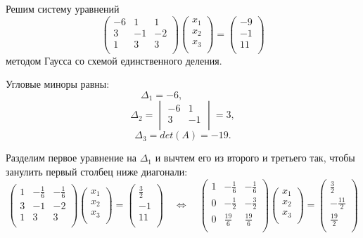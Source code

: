 \documentclass{article}
\begin{document}
\begin{example}\label{eq:gauss_elimination_example}
	Решим систему уравнений
	\[
		\begin{pmatrix}
			-6	& 1	& 1	\\
			3	& -1	& -2	\\
			1	& 3	& 3	\\
		\end{pmatrix}
		\begin{pmatrix}
			x_1 \\
			x_2 \\
			x_3 \\
		\end{pmatrix}
		=
		\begin{pmatrix}
			-9 \\
			-1 \\
			11 \\
		\end{pmatrix}
	\]
	методом Гаусса со схемой единственного деления.

	Угловые миноры равны:
	\[\Delta_1=-6,\qquad\qquad\;\]
	\[\Delta_2=
		\begin{vmatrix}
			-6	& 1	\\
			3	& -1	\\
		\end{vmatrix}
		=3,
	\]
	\[\Delta_3=det(A)=-19.\]

	Разделим первое уравнение на $\Delta_1$ и вычтем его из второго и
	третьего так, чтобы занулить первый столбец ниже диагонали:
	\[
		\begin{pmatrix}
			1	&-\frac{1}{6}	& -\frac{1}{6}	\\
			3	& -1	& -2	\\
			1	& 3	& 3	\\
		\end{pmatrix}
		\begin{pmatrix}
			x_1 \\
			x_2 \\
			x_3 \\
		\end{pmatrix}
		=
		\begin{pmatrix}
			\frac{3}{2} \\
			-1 \\
			11 \\
		\end{pmatrix}
		\quad\Leftrightarrow\quad
		\begin{pmatrix}
			1	&-\frac{1}{6}	& -\frac{1}{6}	\\
			0	& -\frac{1}{2}	& -\frac{3}{2}	\\
			0	& \frac{19}{6}	& \frac{19}{6}	\\
		\end{pmatrix}
		\begin{pmatrix}
			x_1 \\
			x_2 \\
			x_3 \\
		\end{pmatrix}
		=
		\begin{pmatrix}
			\frac{3}{2} \\
			-\frac{11}{2} \\
			\frac{19}{2} \\
		\end{pmatrix}
	\]


\end{example}
\end{document}
